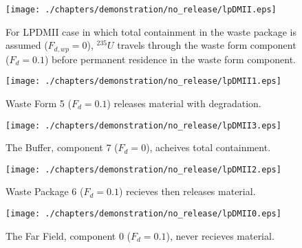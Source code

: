 \begin{figure}[ht]
\centering
\texttt{[image: ./chapters/demonstration/no\_release/lpDMII.eps]}
\caption[$^{235}U$ residence. Lumped Parameter  DM Waste Package No Release.]{
For LPDMII case in which total containment in the waste package is assumed 
($F_{d,wp}=0$), $^{235}U$ travels through the waste form component ($F_d = 0.1$) before 
permanent residence in the waste form component.
}
\label{fig:lpDMIIall}
\begin{minipage}[b]{0.45\linewidth}

  \texttt{[image: ./chapters/demonstration/no\_release/lpDMII1.eps]}
  \caption[LPDMII Waste Form Contaminants.]{
    Waste Form 5 ($F_d = 0.1$) releases material with degradation. 
    }
  \label{fig:lpDMIIwf5}
  
  \texttt{[image: ./chapters/demonstration/no\_release/lpDMII3.eps]}
  \caption[Case LPDMII Buffer Contaminants]{
    The Buffer, component 7 ($F_d=0$), acheives total containment.
    }
  \label{fig:lpDMIIbuff}

\end{minipage}
\hspace{0.05\linewidth}
\begin{minipage}[b]{0.45\linewidth}
  \texttt{[image: ./chapters/demonstration/no\_release/lpDMII2.eps]}
  \caption[Case LPDMII Waste Package Contaminants.]{ 
    Waste Package 6 ($F_d = 0.1$) recieves then releases material. 
    }
  \label{fig:lpDMIIwp6}

  \texttt{[image: ./chapters/demonstration/no\_release/lpDMII0.eps]}
  \caption[Case LPDMII Waste Package Contaminants.]{ 
    The Far Field, component 0 ($F_d = 0.1$), never recieves material.
    }
  \label{fig:lpDMIIff0}


  \end{minipage}
\end{figure}
%
